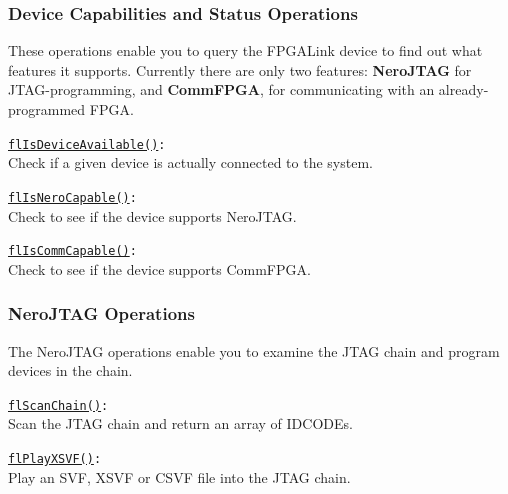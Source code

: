 \newpage
\subsubsection{Device Capabilities and Status Operations}
These operations enable you to query the FPGALink device to find out what features it supports. Currently there are only two features: \textbf{NeroJTAG} for JTAG-programming, and \textbf{CommFPGA}, for communicating with an already-programmed FPGA.

\begin{desc}
  \item[\texttt{\href{http://www.swaton.ukfsn.org/bin/fpgalink-MAKESTUFF_TODAY_DATE/api/libfpgalink\_8h.html\#a223dc9f94043ac92e744b5b3390a3f0c}{flIsDeviceAvailable()}:}] \hfill \\
    Check if a given device is actually connected to the system.
  \item[\texttt{\href{http://www.swaton.ukfsn.org/bin/fpgalink-MAKESTUFF_TODAY_DATE/api/libfpgalink\_8h.html\#a7af1b24a52d15edd73ad19a5e392abd2}{flIsNeroCapable()}:}] \hfill \\
    Check to see if the device supports NeroJTAG.
  \item[\texttt{\href{http://www.swaton.ukfsn.org/bin/fpgalink-MAKESTUFF_TODAY_DATE/api/libfpgalink\_8h.html\#ae9c77acac33d48758fb0bfdee0c7a8d8}{flIsCommCapable()}:}] \hfill \\
    Check to see if the device supports CommFPGA.
\end{desc}

\subsubsection{NeroJTAG Operations}
The NeroJTAG operations enable you to examine the JTAG chain and program devices in the chain.

\begin{desc}
  \item[\texttt{\href{http://www.swaton.ukfsn.org/bin/fpgalink-MAKESTUFF_TODAY_DATE/api/libfpgalink\_8h.html\#a32d14b999b8e9d0befde895d4272e4ef}{flScanChain()}:}] \hfill \\
    Scan the JTAG chain and return an array of IDCODEs.
  \item[\texttt{\href{http://www.swaton.ukfsn.org/bin/fpgalink-MAKESTUFF_TODAY_DATE/api/libfpgalink\_8h.html\#ab51ec323f4cc1d81dbf2ce32c53b3b37}{flPlayXSVF()}:}] \hfill \\
    Play an SVF, XSVF or CSVF file into the JTAG chain.
\end{desc}

